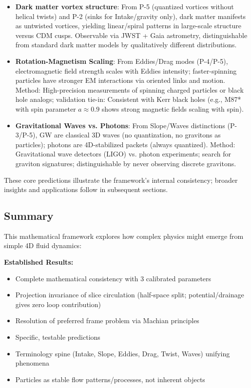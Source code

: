 \begin{itemize}
\item \textbf{Dark matter vortex structure}: From P-5 (quantized vortices without helical twists) and P-2 (sinks for Intake/gravity only), dark matter manifests as untwisted vortices, yielding linear/spiral patterns in large-scale structure versus CDM cusps. Observable via JWST + Gaia astrometry, distinguishable from standard dark matter models by qualitatively different distributions.
\item \textbf{Rotation-Magnetism Scaling}: From Eddies/Drag modes (P-4/P-5), electromagnetic field strength scales with Eddies intensity; faster-spinning particles have stronger EM interactions via oriented links and motion. Method: High-precision measurements of spinning charged particles or black hole analogs; validation tie-in: Consistent with Kerr black holes (e.g., M87* with spin parameter $a \approx 0.9$ shows strong magnetic fields scaling with spin).
\item \textbf{Gravitational Waves vs. Photons}: From Slope/Waves distinctions (P-3/P-5), GW are classical 3D waves (no quantization, no gravitons as particles); photons are 4D-stabilized packets (always quantized). Method: Gravitational wave detectors (LIGO) vs. photon experiments; search for graviton signatures; distinguishable by never observing discrete gravitons.
\end{itemize}

These core predictions illustrate the framework's internal consistency; broader insights and applications follow in subsequent sections.

\subsection{Summary}

This mathematical framework explores how complex physics might emerge from simple 4D fluid dynamics:

\textbf{Established Results:}
\begin{itemize}
\item Complete mathematical consistency with 3 calibrated parameters
\item Projection invariance of slice circulation (half-space split; potential/drainage gives zero loop contribution)
\item Resolution of preferred frame problem via Machian principles
\item Specific, testable predictions
\item Terminology spine (Intake, Slope, Eddies, Drag, Twist, Waves) unifying phenomena
\item Particles as stable flow patterns/processes, not inherent objects
\end{itemize}

